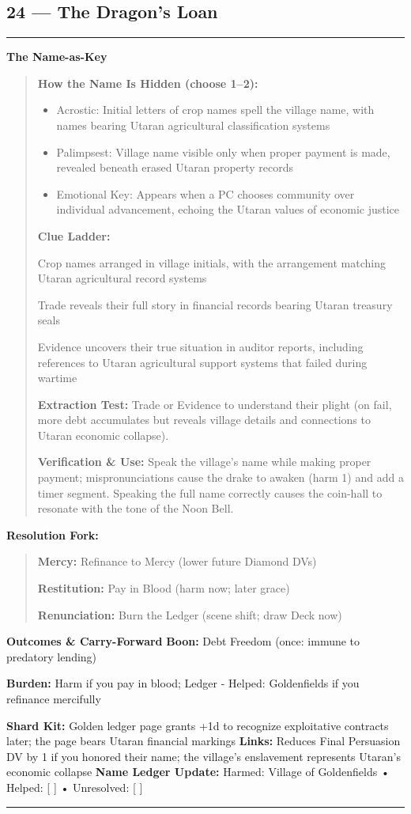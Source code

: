 \documentclass[18pt, letterpaper, twoside]{article}
\newenvironment{floorbox}[1]{%
    \begin{center}
    \begin{minipage}{0.95\textwidth}
    \subsection*{#1}
    \vspace{-0.5em}
    \rule{\textwidth}{0.5pt}
    \vspace{0.5em}
}{%
    \vspace{0.5em}
    \rule{\textwidth}{0.5pt}
    \end{minipage}
    \end{center}
}
\newenvironment{gmnote}[1]{%
    \vspace{0.5em}
    \noindent\textbf{#1}
    \begin{quote}
}{%
    \end{quote}
    \vspace{0.5em}
}
\newenvironment{resolutionbox}{%
    \vspace{0.5em}
    \noindent\textbf{Resolution Fork:}
    \begin{quote}
}{%
    \end{quote}
    \vspace{0.5em}
}
\newcommand{\boon}[1]{\noindent\textbf{Boon:} #1\par}
\newcommand{\burden}[1]{\noindent\textbf{Burden:} #1\par}
\begin{document}
\begin{floorbox}{24 --- The Dragon's Loan}
\begin{gmnote}{The Name-as-Key}
\textbf{How the Name Is Hidden (choose 1--2):}
\begin{itemize}[leftmargin=*]
    \item Acrostic: Initial letters of crop names spell the village name, with names bearing Utaran agricultural classification systems
    \item Palimpsest: Village name visible only when proper payment is made, revealed beneath erased Utaran property records
    \item Emotional Key: Appears when a PC chooses community over individual advancement, echoing the Utaran values of economic justice
\end{itemize}

\textbf{Clue Ladder:}
\begin{description}[leftmargin=*, style=unboxed]
    \item[Gentle Nudge:] Crop names arranged in village initials, with the arrangement matching Utaran agricultural record systems
    \item[Actionable Lead:] Trade reveals their full story in financial records bearing Utaran treasury seals
    \item[Aha! Proof:] Evidence uncovers their true situation in auditor reports, including references to Utaran agricultural support systems that failed during wartime
\end{description}

\textbf{Extraction Test:} Trade or Evidence to understand their plight (on fail, more debt accumulates but reveals village details and connections to Utaran economic collapse).

\textbf{Verification \& Use:} Speak the village's name while making proper payment; mispronunciations cause the drake to awaken (harm 1) and add a timer segment. Speaking the full name correctly causes the coin-hall to resonate with the tone of the Noon Bell.
\end{gmnote}

\begin{resolutionbox}
\textbf{Mercy:} Refinance to Mercy (lower future Diamond DVs)

\textbf{Restitution:} Pay in Blood (harm now; later grace)

\textbf{Renunciation:} Burn the Ledger (scene shift; draw Deck now)
\end{resolutionbox}

\textbf{Outcomes \& Carry-Forward}
\boon{Debt Freedom (once: immune to predatory lending)}
\burden{Harm if you pay in blood; Ledger - Helped: Goldenfields if you refinance mercifully}
\textbf{Shard Kit:} Golden ledger page grants +1d to recognize exploitative contracts later; the page bears Utaran financial markings
\textbf{Links:} Reduces Final Persuasion DV by 1 if you honored their name; the village's enslavement represents Utaran's economic collapse
\textbf{Name Ledger Update:} Harmed: Village of Goldenfields • Helped: [ ] • Unresolved: [ ]


\end{floorbox}
\end{document}
